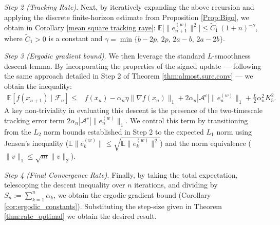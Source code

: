 \documentclass{article}
\begin{document}
\emph{Step 2 (Tracking Rate)}. Next, by iteratively expanding the above recursion and applying the discrete finite-horizon estimate from Proposition \ref{Prop:Bigo}, we obtain in Corollary  \ref{mean square tracking raye}: $\mathbb{E}\big[\|e_{n+1}^{(w)}\|^2\big] \le \widetilde{C}_1\,(1+n)^{-\gamma}$, where $\widetilde{C}_1 > 0$ is a constant and  $\gamma = \min \{b-2p,\, 2p,\, 2a-b,\, 2a-2b\}$.

\emph{Step 3 (Ergodic gradient bound)}. We then leverage the standard $L$-smoothness descent lemma. By incorporating the properties of the signed update --- following the same approach detailed in Step 2 of Theorem \ref{thm:almost.sure.conv} --- we obtain the inequality:
\[
\begin{aligned}
\mathbb{E}[f(x_{n+1}) \mid \mathcal{F}_n]
\le{}&
f(x_n)
- \alpha_n \eta \|\nabla f(x_n)\|_1
+ 2\alpha_n |\mathcal{A}^c| \|e_n^{(w)}\|_1
+ \frac{L}{2}\alpha_n^2 K_5^2 .
\end{aligned}
\]
A key non-triviality in evaluating this descent is the presence of the two-timescale tracking error term $2\alpha_n |\mathcal{A}^c| \|e_n^{(w)}\|_1$. We control this term by transitioning from the $L_2$ norm bounds established in Step 2 to the expected $L_1$ norm using Jensen's inequality ($\mathbb{E}\|e_k^{(w)}\| \le \sqrt{\mathbb{E}\|e_k^{(w)}\|^2}$) and the norm equivalence ($\|v\|_1 \le \sqrt{m}\|v\|_2$).

\emph{Step 4 (Final Convergence Rate)}. Finally, by taking the total expectation, telescoping the descent inequality over $n$ iterations, and dividing by $S_n := \sum_{k=1}^n \alpha_k$, we obtain the ergodic gradient bound (Corollary \ref{cor:ergodic_constants}). Substituting the step-size given in Theorem \ref{thm:rate_optimal} we obtain the desired result.

\end{document}

